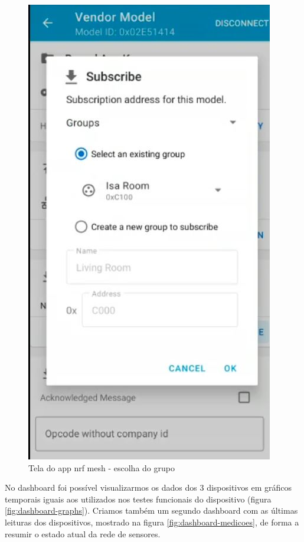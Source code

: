 \documentclass[../monografia.tex]{subfiles}
\begin{document}
\begin{figure}[h]
	\centering
	\includegraphics[scale=0.5]{mesh-subscribe.JPG}
	\caption{Tela do app nrf mesh - escolha do grupo}
	\label{mesh-subscribe}
\end{figure}

No dashboard foi possível visualizarmos os dados dos 3 dispositivos em gráficos temporais iguais aos utilizados nos testes funcionais do dispositivo (figura \ref{fig:dashboard-graphs}). Criamos também um segundo dashboard com as últimas leituras dos dispositivos, mostrado na figura \ref{fig:dashboard-medicoes}, de forma a resumir o estado atual da rede de sensores. 
\end{document}
